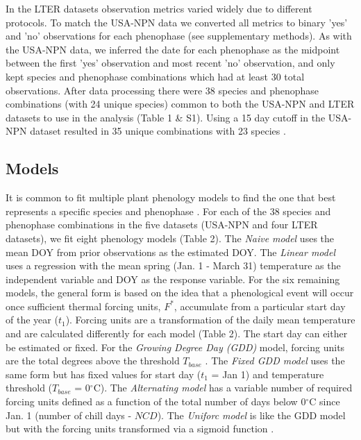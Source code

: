 \documentclass[fleqn,12pt,lineno]{article}
\begin{document}
In the LTER datasets observation metrics varied widely due to different protocols. To match the USA-NPN data we converted all metrics to binary 'yes' and 'no' observations for each phenophase (see supplementary methods). As with the USA-NPN data, we inferred the date for each phenophase as the midpoint between the first 'yes' observation and most recent 'no' observation, and only kept species and phenophase combinations which had at least 30 total observations. After data processing there were 38 species and phenophase combinations (with 24 unique species) common to both the USA-NPN and LTER datasets to use in the analysis (Table 1 \& S1). Using a 15 day cutoff in the USA-NPN dataset resulted in 35 unique combinations with 23 species .

\subsection*{Models}

It is common to fit multiple plant phenology models to find the one that best represents a specific species and phenophase \citep{chuine2013}. For each of the 38 species and phenophase combinations in the five datasets (USA-NPN and four LTER datasets), we fit eight phenology models (Table 2). The \textit{Naive model} uses the mean DOY from prior observations as the estimated DOY. The \textit{Linear model} uses a regression with the mean spring (Jan. 1 - March 31) temperature as the independent variable and DOY as the response variable. For the six remaining models, the general form is based on the idea that a phenological event will occur once sufficient thermal forcing units, $F^{*}$, accumulate from a particular start day of the year ($t_{1}$). Forcing units are a transformation of the daily mean temperature and are calculated differently for each model (Table 2). The start day can either be estimated or fixed. For the \textit{Growing Degree Day (GDD)} model, forcing units are the total degrees above the threshold $T_{base}$ \citep{reaumur1735, wang1960, hunter1992}. The \textit{Fixed GDD model} uses the same form but has fixed values for start day ($t_{1}$ = Jan 1) and temperature threshold ($T_{base}$ = 0$^{\circ}$C). The \textit{Alternating model} has a variable number of required forcing units defined as a function of the total number of days below 0$^{\circ}$C since Jan. 1 (number of chill days - $NCD$). The \textit{Uniforc model} is like the GDD model but with the forcing units transformed via a sigmoid function \citep{chuine2000}. 
\end{document}
